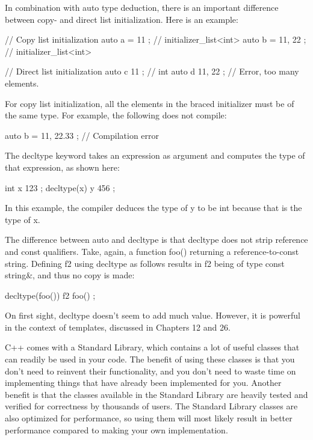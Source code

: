 In combination with auto type deduction, there is an important difference between copy- and direct list initialization. Here is an example:

\begin{cpp}
// Copy list initialization
auto a = { 11 }; // initializer_list<int>
auto b = { 11, 22 }; // initializer_list<int>

// Direct list initialization
auto c { 11 }; // int
auto d { 11, 22 }; // Error, too many elements.
\end{cpp}

For copy list initialization, all the elements in the braced initializer must be of the same type. For example, the following does not compile:

\begin{cpp}
auto b = { 11, 22.33 }; // Compilation error
\end{cpp}


The decltype keyword takes an expression as argument and computes the type of that expression, as shown here:

\begin{cpp}
int x { 123 };
decltype(x) y { 456 };
\end{cpp}

In this example, the compiler deduces the type of y to be int because that is the type of x.

The difference between auto and decltype is that decltype does not strip reference and const qualifiers. Take, again, a function foo() returning a reference-to-const string. Defining f2 using decltype as follows results in f2 being of type const string\&, and thus no copy is made:

\begin{cpp}
decltype(foo()) f2 { foo() };
\end{cpp}

On first sight, decltype doesn’t seem to add much value. However, it is powerful in the context of templates, discussed in Chapters 12 and 26.


C++ comes with a Standard Library, which contains a lot of useful classes that can readily be used in your code. The benefit of using these classes is that you don’t need to reinvent their functionality, and you don’t need to waste time on implementing things that have already been implemented for you. Another benefit is that the classes available in the Standard Library are heavily tested and verified for correctness by thousands of users. The Standard Library classes are also optimized for performance, so using them will most likely result in better performance compared to making your own implementation.


